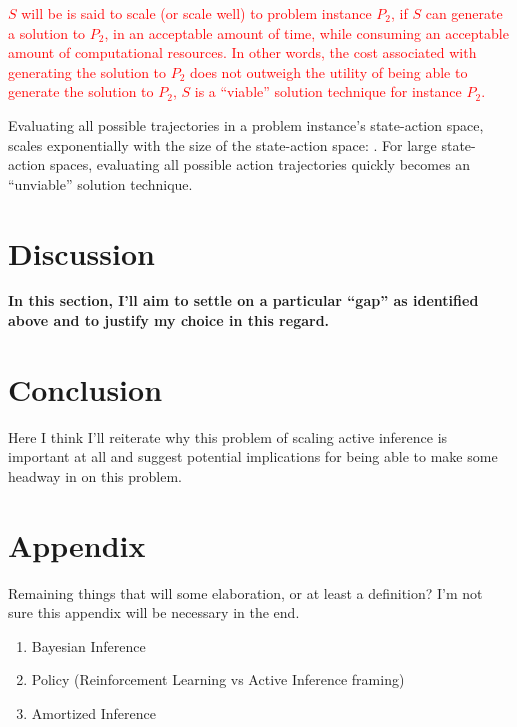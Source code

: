 \documentclass[onecolumn]{IEEEtran}
\begin{document}
\textcolor{red}{$S$ will be is said to scale (or scale well) to problem instance $P_2$, if $S$ can generate a solution to $P_2$, in an acceptable amount of time, while consuming an acceptable amount of computational resources. In other words, the cost associated with generating the solution to $P_2$ does not outweigh the utility of being able to generate the solution to $P_2$, $S$ is a ``viable'' solution technique for instance $P_2$.}

Evaluating all possible trajectories in a problem instance's state-action space, scales exponentially with the size of the state-action space: \textcite{Applications-of-FEP-Machine-Learning-Neuroscience}. For large state-action spaces, evaluating all possible action trajectories quickly becomes an ``unviable'' solution technique.

\section{Discussion}
\textbf{In this section, I'll aim to settle on a particular ``gap'' as identified above and to justify my choice in this regard.}

\section{Conclusion}

Here I think I'll reiterate why this problem of scaling active inference is important at all and suggest potential implications for being able to make some headway in on this problem. 

\appendix
\section{Appendix}

Remaining things that will some elaboration, or at least a definition? I'm not sure this appendix will be necessary in the end.

\begin{enumerate}
	\item Bayesian Inference
	\item Policy (Reinforcement Learning vs Active Inference framing)
	\item Amortized Inference
\end{enumerate}


\printbibliography
\end{document}
